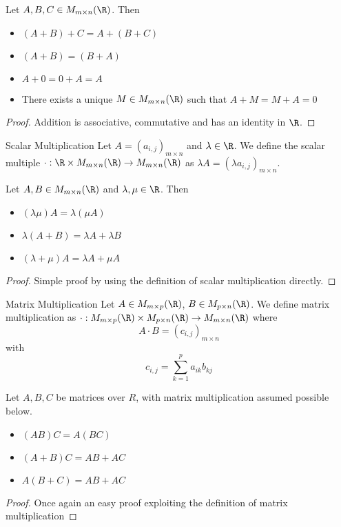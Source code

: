 \begin{prp}{}{} Let $A,B,C\in M_{m\times n}(\R)$. Then 
\begin{itemize}
\item $(A+B)+C=A+(B+C)$
\item $(A+B)=(B+A)$
\item $A+0=0+A=A$
\item There exists a unique $M\in M_{m\times n}(\R)$ such that $A+M=M+A=0$
\end{itemize}
\end{prp}
\begin{proof} Addition is associative, commutative and has an identity in $\R$. 
\end{proof}

\begin{defn}{Scalar Multiplication}{} Let $A=(a_{i,j})_{m\times n}$ and $\lambda\in\R$. We define the scalar multiple $\cdot:\R\times M_{m\times n}(\R)\to M_{m\times n}(\R)$ as $\lambda A=(\lambda a_{i,j})_{m\times n}$. 
\end{defn}

\begin{prp}{}{} Let $A,B\in M_{m\times n}(\R)$ and $\lambda,\mu\in\R$. Then
\begin{itemize}
\item $(\lambda\mu)A=\lambda(\mu A)$
\item $\lambda(A+B)=\lambda A+\lambda B$
\item $(\lambda+\mu)A=\lambda A+\mu A$
\end{itemize}
\end{prp}
\begin{proof} Simple proof by using the definition of scalar multiplication directly. 
\end{proof}

\begin{defn}{Matrix Multiplication}{} Let $A\in M_{m\times p}(\R)$, $B\in M_{p\times n}(\R)$. We define matrix multiplication as $\cdot:M_{m\times p}(\R)\times M_{p\times n}(\R)\to M_{m\times n}(\R)$ where $$A\cdot B=(c_{i,j})_{m\times n}$$ with $$c_{i,j}=\sum_{k=1}^pa_{ik}b_{kj}$$
\end{defn}

\begin{prp}{}{} Let $A,B,C$ be matrices over $R$, with matrix multiplication assumed possible below. 
\begin{itemize}
\item $(AB)C=A(BC)$
\item $(A+B)C=AB+AC$
\item $A(B+C)=AB+AC$
\end{itemize}\tcbline
\begin{proof} Once again an easy proof exploiting the definition of matrix multiplication
\end{proof}
\end{prp}


